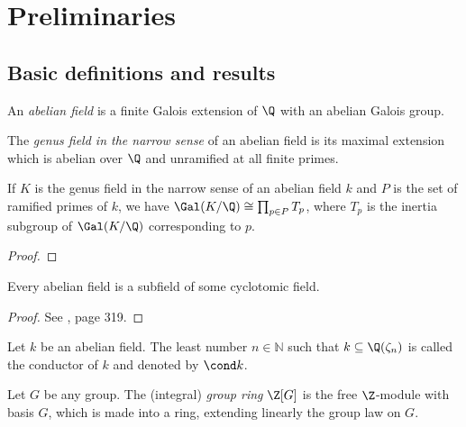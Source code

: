 \chapter{Preliminaries}
\setcounter{page}{1}

\section{Basic definitions and results}
\begin{definition}
An \textit{abelian field} is a finite Galois extension of $\Q$ with an abelian Galois group. 
\end{definition}

\begin{definition}
The \textit{genus field in the narrow sense} of an abelian field is its maximal extension which is abelian over $\Q$ and unramified at all finite primes. %
\end{definition}

\begin{lemma}\label{genus}
If $K$ is the genus field in the narrow sense of an abelian field $k$ and $P$ is the set of ramified primes of $k$, we have $\Gal(K/\Q)\cong \prod_{p\in P} T_p$, where $T_p$ is the inertia subgroup of $\Gal(K/\Q)$ corresponding to $p$.
\end{lemma}
\begin{proof}
\end{proof}

\begin{theorem}
Every abelian field is a subfield of some cyclotomic field.
\end{theorem}
\begin{proof}
See \citep{washington1982}, page 319.
\end{proof}

\begin{definition}
Let $k$ be an abelian field. The least number $n\in\mathbb{N}$ such that $k\subseteq \Q(\zeta_n)$ is called the conductor of $k$ and denoted by $\cond k$.
\end{definition}

\begin{definition}
Let $G$ be any group. The (integral) \textit{group ring} $\Z[G]$ is the free $\Z$-module with basis $G$, which is made into a ring, extending linearly the group law on $G$.
\end{definition}

